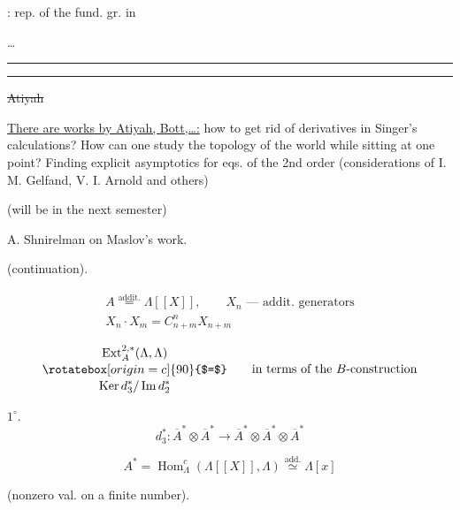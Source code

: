 : rep. of the fund. gr. in

\ldots

{\centering\rule{4em}{1pt}\quad\textbullet\quad\rule{4em}{1pt}\par}

\sout{Atiyah}

\uline{There are works by Atiyah, Bott,\ldots:} how to get rid of derivatives in Singer's calculations?
How can one study the topology of the world while sitting at one point? Finding explicit asymptotics for eqs. of the 2nd order (considerations of I. M. Gelfand, V. I. Arnold and others)

(will be in the next semester)

A. Shnirelman on Maslov's work.



 (continuation).

\[
\begin{gathered}
A\overset{\text{addit.}}{=}\Lambda[[X]],\qquad
X_n\text{ — addit. generators}\\
X_n\cdot X_m=C_{n+m}^n X_{n+m}
\end{gathered}
\]


\[
\begin{gathered}
\operatorname{Ext}_A^{2,*}(\Lambda,\Lambda)\\[-.4ex]
\rotatebox[origin=c]{90}{$=$}\\[-.4ex]
\operatorname{Ker}d_3^*/\operatorname{Im}d_2^*
\end{gathered}
\qquad\text{in terms of the }B\text{-construction}
\]

$1^\circ$.
\[
d_3^*\colon\overline A^*\otimes\overline A^*
\longrightarrow\overline A^*\otimes\overline A^*\otimes\overline A^*
\]

\[
A^*=\operatorname{Hom}_{\Lambda}^{c}(\Lambda[[X]],\Lambda)
\overset{\text{add.}}{\simeq}\Lambda[x]
\]

 (nonzero val. on a finite number).


